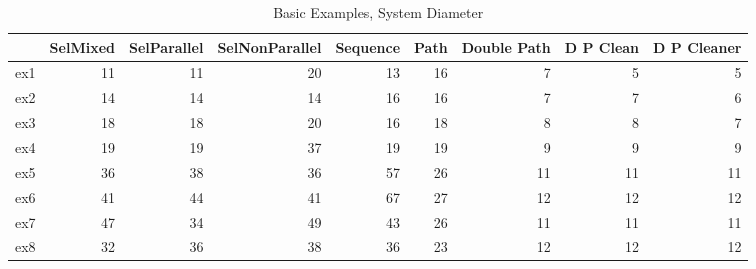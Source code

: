 \begin{table}
\centering
\caption{Basic Examples, System Diameter}
\label{b_e_diam}
\begin{tabular}{lrrrrrrrr}
\toprule
{} &  SelMixed &  SelParallel &  SelNonParallel &  Sequence &  Path &  Double Path &  D P Clean &  D P Cleaner \\
\midrule
ex1 &        11 &           11 &              20 &        13 &    16 &            7 &          5 &            5 \\
ex2 &        14 &           14 &              14 &        16 &    16 &            7 &          7 &            6 \\
ex3 &        18 &           18 &              20 &        16 &    18 &            8 &          8 &            7 \\
ex4 &        19 &           19 &              37 &        19 &    19 &            9 &          9 &            9 \\
ex5 &        36 &           38 &              36 &        57 &    26 &           11 &         11 &           11 \\
ex6 &        41 &           44 &              41 &        67 &    27 &           12 &         12 &           12 \\
ex7 &        47 &           34 &              49 &        43 &    26 &           11 &         11 &           11 \\
ex8 &        32 &           36 &              38 &        36 &    23 &           12 &         12 &           12 \\
\bottomrule
\end{tabular}
\end{table}

